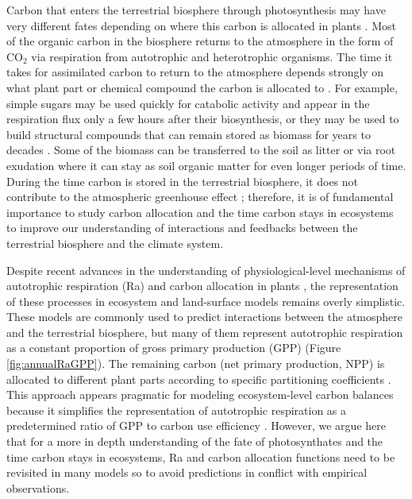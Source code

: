 \documentclass[bg, manuscript]{copernicus}
\begin{document}
\introduction  %
Carbon that enters the terrestrial biosphere through photosynthesis may have very different fates depending on where this carbon is allocated in plants \citep{Trumbore2006}. Most of the organic carbon in the biosphere returns to the atmosphere in the form of CO$_2$ via respiration from autotrophic and heterotrophic organisms. The time it takes for assimilated carbon to return to the atmosphere depends strongly on what plant part or chemical compound the carbon is allocated to \citep{Rasmussen2016, Luo2017, Lu2018, Herrera2020}. For example, simple sugars may be used quickly for catabolic activity and appear in the respiration flux only a few hours after their biosynthesis, or they may be used to build structural compounds that can remain stored as biomass for years to decades \citep{Hartmann2016}. Some of the biomass can be transferred to the soil as litter or via root exudation where it can stay as soil organic matter for even longer periods of time. During the time carbon is stored in the terrestrial biosphere, it does not contribute to the atmospheric greenhouse effect \citep{Neubauer2015,Sierra2021BGS}; therefore, it is of fundamental importance to study carbon allocation and the time carbon stays in ecosystems to improve our understanding of interactions and feedbacks between the terrestrial biosphere and the climate system. 

Despite recent advances in the understanding of physiological-level mechanisms of autotrophic respiration (Ra) and carbon allocation in plants \citep{Hartmann2016}, the representation of these processes in ecosystem and land-surface models remains overly simplistic. These models are commonly used to predict interactions between the atmosphere and the terrestrial biosphere, but many of them represent autotrophic respiration as a constant proportion of gross primary production (GPP) (Figure \ref{fig:annualRaGPP}). The remaining carbon (net primary production, NPP) is allocated to different plant parts according to specific partitioning coefficients \citep{Franklin2012, Ceballos2020}. This approach appears pragmatic for modeling ecosystem-level carbon balances because it simplifies the representation of autotrophic respiration as a predetermined ratio of GPP to carbon use efficiency \citep{DeLucia2007}. However, we argue here that for a more in depth understanding of the fate of photosynthates and the time carbon stays in ecosystems, Ra and carbon allocation functions need to be revisited in many models so to avoid predictions in conflict with empirical observations. 
\end{document}
